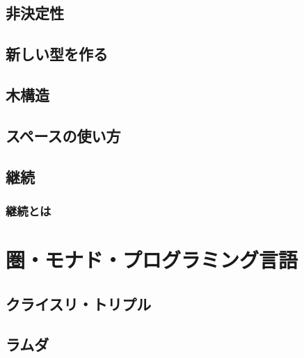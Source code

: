 \documentclass[twocolumn]{jsbook}
\begin{document}
\chapter{非決定性}

\chapter{新しい型を作る}

\chapter{木構造}

\chapter{スペースの使い方}

\chapter{継続}

\section{継続とは}


\part{圏・モナド・プログラミング言語}

\chapter{クライスリ・トリプル}

\chapter{ラムダ}
\end{document}
